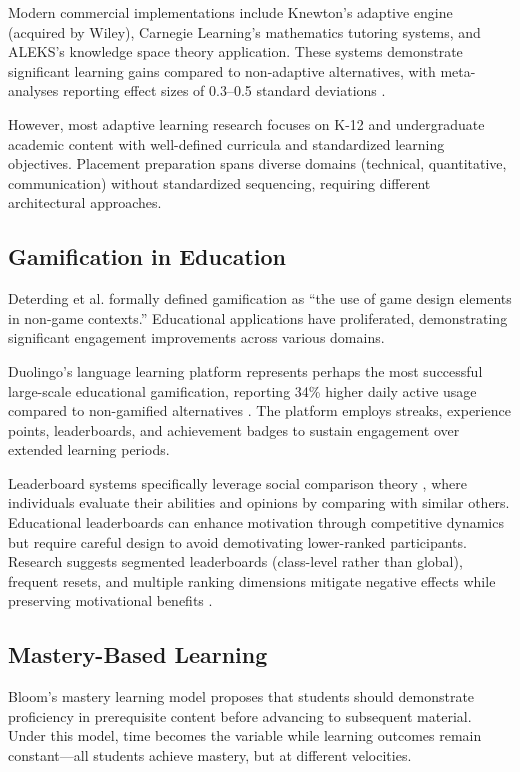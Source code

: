 \documentclass[journal]{IEEEtran}
\begin{document}
Modern commercial implementations include Knewton's adaptive engine (acquired by Wiley), Carnegie Learning's mathematics tutoring systems, and ALEKS's knowledge space theory application. These systems demonstrate significant learning gains compared to non-adaptive alternatives, with meta-analyses reporting effect sizes of 0.3--0.5 standard deviations \cite{ma2014}.

However, most adaptive learning research focuses on K-12 and undergraduate academic content with well-defined curricula and standardized learning objectives. Placement preparation spans diverse domains (technical, quantitative, communication) without standardized sequencing, requiring different architectural approaches.

\subsection{Gamification in Education}

Deterding et al. \cite{deterding2011} formally defined gamification as ``the use of game design elements in non-game contexts.'' Educational applications have proliferated, demonstrating significant engagement improvements across various domains.

Duolingo's language learning platform represents perhaps the most successful large-scale educational gamification, reporting 34\% higher daily active usage compared to non-gamified alternatives \cite{settles2016}. The platform employs streaks, experience points, leaderboards, and achievement badges to sustain engagement over extended learning periods.

Leaderboard systems specifically leverage social comparison theory \cite{festinger1954}, where individuals evaluate their abilities and opinions by comparing with similar others. Educational leaderboards can enhance motivation through competitive dynamics but require careful design to avoid demotivating lower-ranked participants. Research suggests segmented leaderboards (class-level rather than global), frequent resets, and multiple ranking dimensions mitigate negative effects while preserving motivational benefits \cite{dominguez2013}.

\subsection{Mastery-Based Learning}

Bloom's mastery learning model \cite{bloom1968} proposes that students should demonstrate proficiency in prerequisite content before advancing to subsequent material. Under this model, time becomes the variable while learning outcomes remain constant---all students achieve mastery, but at different velocities.
\end{document}
